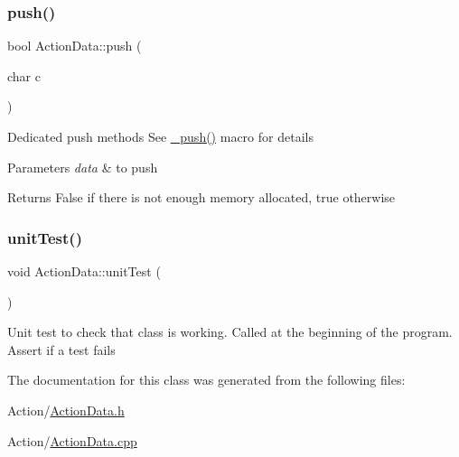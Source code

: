 \subsubsection{\texorpdfstring{push()}{push()}}
{\footnotesize\ttfamily bool Action\+Data\+::push (\begin{DoxyParamCaption}\item[{char}]{c }\end{DoxyParamCaption})}

Dedicated push methods See \mbox{\hyperlink{_action_data_8h_af32898bff77f8e81bd43ad0f30d25221}{\+\_\+push()}} macro for details 
\begin{DoxyParams}{Parameters}
{\em data} & to push \\
\hline
\end{DoxyParams}
\begin{DoxyReturn}{Returns}
False if there is not enough memory allocated, true otherwise 
\end{DoxyReturn}
\mbox{\label{class_m210_1_1_action_data_acf9043b5b953a5a0c837ae679c9ab0e5}} 
\subsubsection{\texorpdfstring{unit\+Test()}{unitTest()}}
{\footnotesize\ttfamily void Action\+Data\+::unit\+Test (\begin{DoxyParamCaption}{ }\end{DoxyParamCaption})\hspace{0.3cm}{\ttfamily [static]}}

Unit test to check that class is working. Called at the beginning of the program. Assert if a test fails 

The documentation for this class was generated from the following files\+:\begin{DoxyCompactItemize}
\item 
Action/\mbox{\hyperlink{_action_data_8h}{Action\+Data.\+h}}\item 
Action/\mbox{\hyperlink{_action_data_8cpp}{Action\+Data.\+cpp}}\end{DoxyCompactItemize}
